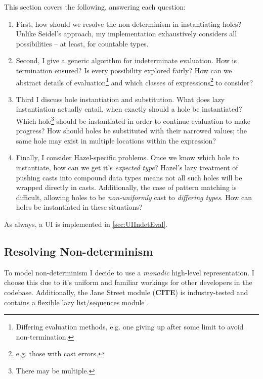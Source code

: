 This section covers the following, answering each question:
\begin{enumerate}
\item[\ref{sec:ResolvingNondeterminism}] First, how should we resolve the non-determinism in instantiating holes? Unlike Seidel's approach, my implementation exhaustively considers all possibilities -- at least, for countable types.
\item[\ref{sec:IndetEvalAlgorithm}] Second, I give a generic algorithm for indeterminate evaluation. How is termination ensured? Is every possibility explored fairly? How can we abstract details of evaluation\footnote{Differing evaluation methods, e.g. one giving up after some limit to avoid non-termination.} and which classes of expressions\footnote{e.g. those with cast errors.} to consider?
\item[\ref{sec:HoleInstantiation}] Third I discuss hole instantiation and substitution. What does lazy instantiation actually entail, when exactly should a hole be instantiated? Which hole\footnote{There may be multiple.} should be instantiated in order to continue evaluation to make progress? How should holes be substituted with their narrowed values; the same hole may exist in multiple locations within the expression? 
\item[{\parbox[t]{1\linewidth}{\raggedleft \ref{sec:CastLaziness}\\ \& \\\ref{sec:PatternMatching}}}] {\parbox[t]{1\linewidth}{Finally, I consider Hazel-specific problems. Once we know which hole to instantiate, how can we get it's \textit{expected type}? Hazel's lazy treatment of pushing casts into compound data types means not all such holes will be wrapped directly in casts. Additionally, the case of pattern matching is difficult, allowing holes to be \textit{non-uniformly} cast to \textit{differing types}. How can holes be instantiated in these situations?}}
\end{enumerate}
As always, a UI is implemented in \cref{sec:UIIndetEval}.

\subsection{Resolving Non-determinism}
\label{sec:ResolvingNondeterminism}
To model non-determinism I decide to use a \textit{monadic} high-level  representation. I choose this due to it's uniform and familiar workings for other developers in the codebase. Additionally, the Jane Street  module (\textbf{CITE}) is industry-tested and contains a flexible lazy list/sequences module .

